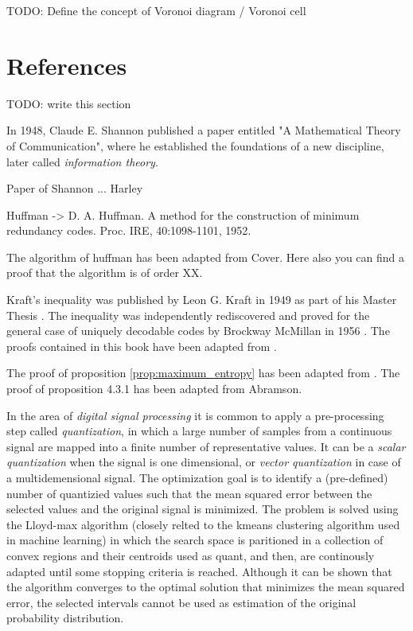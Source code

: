 {\color{red} TODO: Define the concept of Voronoi diagram / Voronoi cell}

\section*{References}

{\color{red} TODO: write this section}

In 1948, Claude E. Shannon published a paper entitled "A Mathematical Theory of Communication", where he established the foundations of a new discipline, later called \emph{information theory}.

Paper of Shannon ... Harley

Huffman -> D. A. Huffman. A method for the construction of minimum redundancy codes. Proc. IRE, 40:1098-1101, 1952.

The algorithm of huffman has been adapted from Cover. Here also you can find a proof that the algorithm is of order XX. 

Kraft's inequality was published by Leon G. Kraft in 1949 as part of his Master Thesis \cite{kraft1949device}. The inequality was independently rediscovered and proved for the general case of uniquely decodable codes by Brockway McMillan in 1956 \cite{mcmillan1956two}. The proofs contained in this book have been adapted from \cite{cover2012elements}.


The proof of proposition \ref{prop:maximum_entropy} has been adapted from \cite{abramson1963information}.
The proof of proposition 4.3.1 has been adapted from Abramson.

In the area of \emph{digital signal processing} \cite{gersho2012vector} it is common to apply a pre-processing step called \emph{quantization}, in which a large number of samples from a continuous signal are mapped into a finite number of representative values. It can be a \emph{scalar quantization} when the signal is one dimensional, or \emph{vector quantization} in case of a multidemensional signal. The optimization goal is to identify a (pre-defined) number of quantizied values such that the mean squared error between the selected values and the original signal is minimized. The problem is solved using the Lloyd-max algorithm \cite{lloyd1982least} (closely relted to the kmeans clustering algorithm \cite{} used in machine learning) in which the search space is paritioned in a collection of convex regions and their centroids used as quant, and then, are continously adapted until some stopping criteria is reached. Although it can be shown that the algorithm converges to the optimal solution that minimizes the mean squared error, the selected intervals cannot be used as estimation of the original probability distribution.




